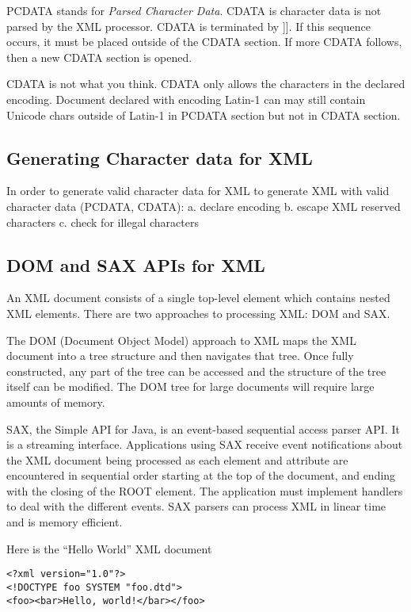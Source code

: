 PCDATA stands for \emph{Parsed Character Data}.
CDATA is character data is not parsed by the XML processor.
CDATA is terminated by ]].  If this sequence occurs, it must be placed outside of
the CDATA section.  If more CDATA follows, then a new CDATA section is opened.

CDATA is not what you think.  CDATA only allows the characters in the declared encoding.
Document declared with encoding Latin-1 can may still contain Unicode chars outside of Latin-1
in PCDATA section but not in CDATA section.


\subsection{Generating Character data for XML}

In order to generate valid character data for XML 
to generate XML with valid character data (PCDATA, CDATA):
a. declare encoding
b. escape XML reserved characters
c. check for illegal characters


\subsection{DOM and SAX APIs for XML}

An XML document consists of a single top-level element which contains
nested XML elements.   There are two approaches to processing XML:
DOM and SAX.

The DOM (Document Object Model) approach to XML maps the XML document into a tree structure
and then navigates that tree.  
Once fully constructed, any part of the tree can be accessed and the structure of 
the tree itself can be modified.
The DOM tree for large documents will require large amounts of memory.

SAX, the Simple API for Java, is an event-based sequential access
parser API.  It is a streaming interface.  Applications using SAX
receive event notifications about the XML document being processed as each
element and attribute are encountered in sequential order starting at the
top of the document, and ending with the closing of the ROOT
element. The application must implement handlers to deal with the different events.
SAX parsers can process XML in
linear time and is memory efficient.

Here is the ``Hello World'' XML document
\begin{verbatim}
<?xml version="1.0"?>
<!DOCTYPE foo SYSTEM "foo.dtd">
<foo><bar>Hello, world!</bar></foo>
\end{verbatim}

